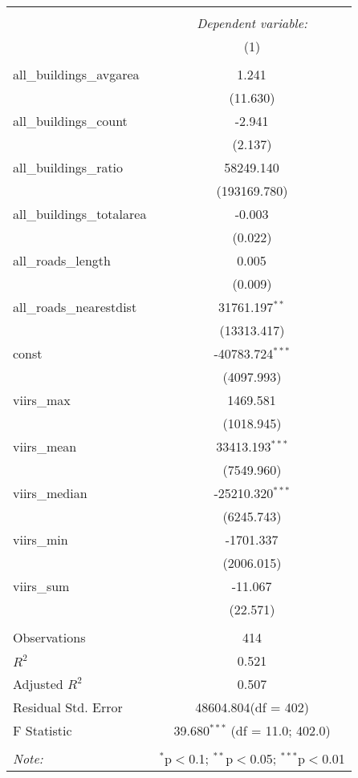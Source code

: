 \begin{table}[!htbp] \centering
\begin{tabular}{@{\extracolsep{5pt}}lc}
\\[-1.8ex]\hline
\hline \\[-1.8ex]
& \multicolumn{1}{c}{\textit{Dependent variable:}} \
\cr \cline{1-2}
\\[-1.8ex] & (1) \\
\hline \\[-1.8ex]
 all_buildings_avgarea & 1.241$^{}$ \\
  & (11.630) \\
 all_buildings_count & -2.941$^{}$ \\
  & (2.137) \\
 all_buildings_ratio & 58249.140$^{}$ \\
  & (193169.780) \\
 all_buildings_totalarea & -0.003$^{}$ \\
  & (0.022) \\
 all_roads_length & 0.005$^{}$ \\
  & (0.009) \\
 all_roads_nearestdist & 31761.197$^{**}$ \\
  & (13313.417) \\
 const & -40783.724$^{***}$ \\
  & (4097.993) \\
 viirs_max & 1469.581$^{}$ \\
  & (1018.945) \\
 viirs_mean & 33413.193$^{***}$ \\
  & (7549.960) \\
 viirs_median & -25210.320$^{***}$ \\
  & (6245.743) \\
 viirs_min & -1701.337$^{}$ \\
  & (2006.015) \\
 viirs_sum & -11.067$^{}$ \\
  & (22.571) \\
\hline \\[-1.8ex]
 Observations & 414 \\
 $R^2$ & 0.521 \\
 Adjusted $R^2$ & 0.507 \\
 Residual Std. Error & 48604.804(df = 402)  \\
 F Statistic & 39.680$^{***}$ (df = 11.0; 402.0) \\
\hline
\hline \\[-1.8ex]
\textit{Note:} & \multicolumn{1}{r}{$^{*}$p$<$0.1; $^{**}$p$<$0.05; $^{***}$p$<$0.01} \\
\end{tabular}
\end{table}